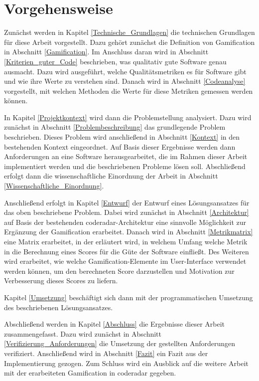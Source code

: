 \documentclass[
	oneside,  %
	ngerman, 
	final, 
	11pt, 
	a4paper, 
	1.1headlines, 
	headinclude=false, 
	footinclude=false, 
	mpinclude=false, 
	pagesize, 
	onecolumn, 
	titlepage, 
	parskip=half, 
	headsepline, 
	chapterprefix=false, 
	version=first, 
	listof=totoc, 
	bibliography=totoc, 
	toc=graduated, 
	fleqn
]{scrbook}
\begin{document}
\section{Vorgehensweise}
\label{Vorgehensweise}
Zunächst werden in Kapitel \ref{Technische_Grundlagen} die technischen Grundlagen für diese Arbeit vorgestellt.
Dazu gehört zunächst die Definition von Gamification in Abschnitt \ref{Gamification}.
Im Anschluss daran wird in Abschnitt \ref{Kriterien_guter_Code} beschrieben, was qualitativ gute Software genau ausmacht.
Dazu wird ausgeführt, welche Qualitätsmetriken es für Software gibt und wie ihre Werte zu verstehen sind.
Danach wird in Abschnitt \ref{Codeanalyse} vorgestellt, mit welchen Methoden die Werte für diese Metriken gemessen werden können.

In Kapitel \ref{Projektkontext} wird dann die Problemstellung analysiert.
Dazu wird zunächst in Abschnitt \ref{Problembeschreibung} das grundlegende Problem beschrieben.
Dieses Problem wird anschließend in Abschnitt \ref{Kontext} in den bestehenden Kontext eingeordnet.
Auf Basis dieser Ergebnisse werden dann Anforderungen an eine Software herausgearbeitet, die im Rahmen dieser Arbeit implementiert werden und die beschriebenen Probleme lösen soll.
Abschließend erfolgt dann die wissenschaftliche Einordnung der Arbeit in Abschnitt \ref{Wissenschaftliche_Einordnung}.

Anschließend erfolgt in Kapitel \ref{Entwurf} der Entwurf eines Lösungsansatzes für das oben beschriebene Problem.
Dabei wird zunächst in Abschnitt \ref{Architektur} auf Basis der bestehenden coderadar-Architektur eine sinnvolle Möglichkeit zur Ergänzung der Gamification erarbeitet.
Danach wird in Abschnitt \ref{Metrikmatrix} eine Matrix erarbeitet, in der erläutert wird, in welchem Umfang welche Metrik in die Berechnung eines Scores für die Güte der Software einfließt.
Des Weiteren wird erarbeitet, wie welche Gamification-Elemente im User-Interface verwendet werden können, um den berechneten Score darzustellen und Motivation zur Verbesserung dieses Scores zu liefern.

Kapitel \ref{Umsetzung} beschäftigt sich dann mit der programmatischen Umsetzung des beschriebenen Lösungsansatzes. 

Abschließend werden in Kapitel \ref{Abschluss} die Ergebnisse dieser Arbeit zusammengefasst.
Dazu wird zunächst in Abschnitt \ref{Verifizierung_Anforderungen} die Umsetzung der gestellten Anforderungen verifiziert.
Anschließend wird in Abschnitt \ref{Fazit} ein Fazit aus der Implementierung gezogen.
Zum Schluss wird ein Ausblick auf die weitere Arbeit mit der erarbeiteten Gamification in coderadar gegeben.
\end{document}
